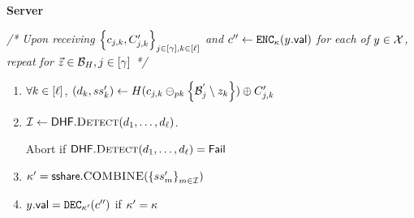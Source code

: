 \begin{mdframed}[frametitle={Delegated Fuzzy PSI}, frametitlealignment=\centering, 
	font=\small]
	\smallskip\noindent\textbf{Server}
	
	\noindent\textit{/* Upon receiving $\setDefn{\cOutputSig[\projIdx][\vecIdx], 
			\cOutputEnc[\projIdx][\vecIdx]}_{\projIdx \in \nats[\numProjections], \vecIdx \in 
			\nats[\genericVecLen]}$ and $\cOutputVal \assign 
		\encrypt[\genericSymmKey](\genericCInputElmt.\valueLabel)$ for each of $\genericCInputElmt 
		\in \cInputSet$, repeat  for $\genericVec \in 
		\blocklistEmbedded, \projIdx \in \nats[\numProjections]$ */}
	
	
	
	\begin{enumerate}
		
		
		\item[\serverLabel{server:verify}] 
		$\forall \vecIdx \in \nats[\genericVecLen]$, $(\dhfOutput{\vecIdx}, \secretShare{\vecIdx}') 
		\assign 
		\ro(\cOutputSig[\projIdx][\vecIdx]\sigMinus[\pubKey]  
		\setDefn{\projBucketsAugmented[\projIdx] 
			\setminus \genericVec[\vecIdx]}) \oplus \cOutputEnc[\projIdx][\vecIdx]$
		
		\item[\serverLabel{server:dhf}]
		$\matchedIndexSet \assign \dhf.\dhfDetect(\dhfOutput{1}, \dots, \dhfOutput{\genericVecLen})$. 
		
		Abort if $\dhf.\dhfDetect(\dhfOutput{1}, \dots, \dhfOutput{\genericVecLen}) = \dhfFail$
		
		\item[\serverLabel{server:combine}] $\genericSymmKey' = 
		\secretSharingScheme.\SSCombine(\setDefn{\secretShare{\ssIdx}'}_{\ssIdx \in 
			\matchedIndexSet})$
		
		\item[\serverLabel{server:decrypt}] $\genericCInputElmt.\valueLabel = 
		\decrypt[\genericSymmKey'](\cOutputVal)$ if $\kappa' = \kappa$
		
	\end{enumerate}
	
\end{mdframed}
\fi
